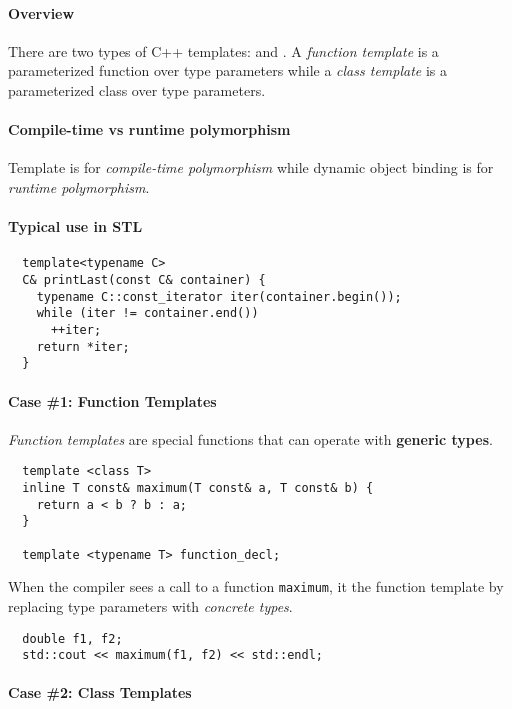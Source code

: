 \documentclass{memo}
\begin{document}
\small
{}

\paragraph{Overview} There are two types of C++ templates:  and . A {\em function template\/} is a
parameterized function over type parameters while a {\em class template\/} is
a parameterized class over type parameters.

\paragraph{Compile-time vs runtime polymorphism}
Template is for {\em compile-time polymorphism\/} while dynamic object binding
is for {\em runtime polymorphism\/}. 

\paragraph{Typical use in STL}
\begin{verbatim}
  template<typename C>
  C& printLast(const C& container) {
    typename C::const_iterator iter(container.begin());
    while (iter != container.end())
      ++iter;
    return *iter;
  }
\end{verbatim}

\paragraph{Case \#1: Function Templates} {\em Function templates\/} are special
functions that can operate with {\bf generic types\/}. 

\begin{verbatim}
  template <class T>
  inline T const& maximum(T const& a, T const& b) {
    return a < b ? b : a;
  }

  template <typename T> function_decl;
\end{verbatim}
When the compiler sees a call to a function \verb+maximum+, it
 the function template by replacing type parameters with {\em
concrete types\/}. 
\begin{verbatim}
  double f1, f2;
  std::cout << maximum(f1, f2) << std::endl;
\end{verbatim}

\paragraph{Case \#2: Class Templates}
\end{document}
